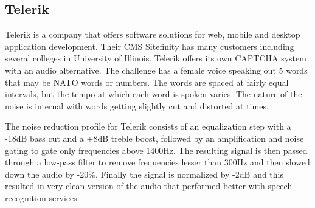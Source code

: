 \subsection{Telerik}
\label{sec:telerik}
Telerik is a company that offers software solutions for web, mobile and desktop application development. Their CMS Sitefinity has many customers including several colleges in University of Illinois. Telerik offers its own CAPTCHA system with an audio alternative. The challenge has a female voice speaking out 5 words that may be NATO words or numbers. The words are spaced at fairly equal intervals, but the tempo at which each word is spoken varies. The nature of the noise is internal with words getting slightly cut and distorted at times.\newline

The noise reduction profile for Telerik consists of an equalization step with a -18dB bass cut and a +8dB treble boost, followed by an amplification and noise gating to gate only frequencies above 1400Hz. The resulting signal is then passed through a low-pass filter to remove frequencies lesser than 300Hz and then slowed down the audio by -20\%. Finally the signal is normalized by -2dB and this resulted in very clean version of the audio that performed better with speech recognition services.





